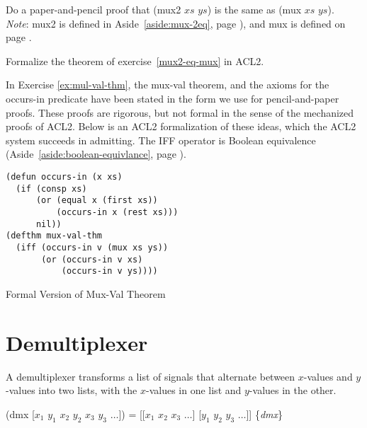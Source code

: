 \begin{ExerciseList}
\Exercise\label{mux2-eq-mux}
Do a paper-and-pencil proof that
(mux2 $xs$ $ys$) is the same as (mux $xs$ $ys$).\\
\emph{Note}: mux2 is defined in
Aside~\ref{aside:mux-2eq}, page \pageref{aside:mux-2eq}),
and mux is defined on page \pageref{mux-defun}.

\Exercise
Formalize the theorem of exercise~\ref{mux2-eq-mux} in ACL2.

\end{ExerciseList}

\begin{aside}
In Exercise \ref{ex:mul-val-thm}, the mux-val theorem,
and the axioms for the occurs-in predicate
have been stated in the form we use for pencil-and-paper proofs.
These proofs are rigorous, but not formal
in the sense of the mechanized proofs of ACL2.
Below is an ACL2 formalization of these ideas,
which the ACL2 system succeeds in admitting.
\label{acl2:iff}
The
IFF operator
is Boolean equivalence
(Aside~\ref{aside:boolean-equivlance}, page \pageref{aside:boolean-equivlance}).
\\

\label{defun:occurs-in}
\begin{Verbatim}
(defun occurs-in (x xs)
  (if (consp xs)
      (or (equal x (first xs))
          (occurs-in x (rest xs)))
      nil))
(defthm mux-val-thm
  (iff (occurs-in v (mux xs ys))
       (or (occurs-in v xs)
           (occurs-in v ys))))
\end{Verbatim}
\label{defthm:mux-val}
\caption{Formal Version of Mux-Val Theorem}
\label{aside:mux-val-thm}
\end{aside}


\section{Demultiplexer}
\label{sec:dmx}

A demultiplexer transforms a list of signals that alternate between
$x$-values and $y$-values into two lists,
with the $x$-values in one list and $y$-values in the other.

\hspace{1cm} (dmx [$x_1$ $y_1$ $x_2$ $y_2$ $x_3$ $y_3$ $\dots$]) =
[[$x_1$ $x_2$ $x_3$ $\dots$] [$y_1$ $y_2$ $y_3$ $\dots$]]
\hfill \{\emph{dmx}\}

